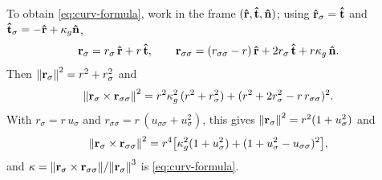 To obtain \eqref{eq:curv-formula}, work in the frame \((\vu r, \vu t, \vu n)\); using \(\vu r_\sigma = \vu t\) and \(\vu t_\sigma = -\vu r + \kappa_g\vu n\),
\begin{equation}
    \vb r_\sigma = r_\sigma\,\vu r + r\,\vu t, \qquad
    \vb r_{\sigma\sigma} = (r_{\sigma\sigma} - r)\,\vu r + 2r_\sigma\,\vu t + r\kappa_g\,\vu n .
\end{equation}
Then \(\norm{\vb r_\sigma}^2 = r^2 + r_\sigma^2\) and
\begin{equation}
    \norm{\vb r_\sigma \times \vb r_{\sigma\sigma}}^2 = r^2\kappa_g^2\,(r^2 + r_\sigma^2) + (r^2 + 2r_\sigma^2 - r\,r_{\sigma\sigma})^2 .
\end{equation}
With \(r_\sigma = r\,u_\sigma\) and \(r_{\sigma\sigma} = r\,(u_{\sigma\sigma} + u_\sigma^2)\), this gives \(\norm{\vb r_\sigma}^2 = r^2(1+u_\sigma^2)\) and
\begin{equation}
    \norm{\vb r_\sigma \times \vb r_{\sigma\sigma}}^2 = r^4\bigl[\kappa_g^2(1+u_\sigma^2) + (1+u_\sigma^2 - u_{\sigma\sigma})^2\bigr],
\end{equation}
and \(\kappa = \norm{\vb r_\sigma\times\vb r_{\sigma\sigma}}/\norm{\vb r_\sigma}^3\) is \eqref{eq:curv-formula}.

